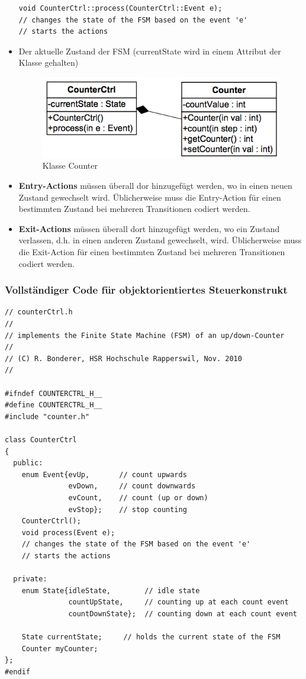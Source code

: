 \begin{itemize}
\begin{lstlisting}
void CounterCtrl::process(CounterCtrl::Event e); 
// changes the state of the FSM based on the event 'e' 
// starts the actions
\end{lstlisting}
\item Der aktuelle Zustand der FSM (currentState wird in einem Attribut der
Klasse gehalten)
\begin{figure}[h]
  \centering
  {\includegraphics[scale = 0.4]{images/FSM/klasseCounter}  
  \caption{Klasse Counter}
  \label{fig:klasseCounter}}
\end{figure}
\item \textbf{Entry-Actions} müssen überall dor hinzugefügt werden, wo in einen
neuen Zustand gewechselt wird. Üblicherweise muss die Entry-Action für einen
bestimmten Zustand bei mehreren Transitionen codiert werden.
\item \textbf{Exit-Actions} müssen überall dort hinzugefügt werden, wo ein
Zustand verlassen, d.h. in einen anderen Zustand gewechselt, wird. Üblicherweise
muss die Exit-Action für einen bestimmten Zustand bei mehreren Transitionen
codiert werden.
\end{itemize}

\subsubsection{Vollständiger Code für objektorientiertes Steuerkonstrukt}
\begin{lstlisting}
// counterCtrl.h
//
// implements the Finite State Machine (FSM) of an up/down-Counter
//
// (C) R. Bonderer, HSR Hochschule Rapperswil, Nov. 2010
//

#ifndef COUNTERCTRL_H__
#define COUNTERCTRL_H__
#include "counter.h"

class CounterCtrl
{
  public:
    enum Event{evUp,       // count upwards
               evDown,     // count downwards
               evCount,    // count (up or down)
               evStop};    // stop counting
    CounterCtrl();
    void process(Event e);
    // changes the state of the FSM based on the event 'e'
    // starts the actions

  private:
    enum State{idleState,        // idle state
               countUpState,     // counting up at each count event
               countDownState};  // counting down at each count event

    State currentState;     // holds the current state of the FSM
    Counter myCounter;
};
#endif
\end{lstlisting}

